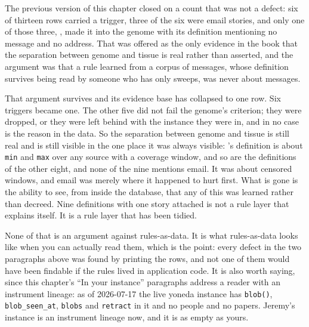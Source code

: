 The previous version of this chapter closed on a count that was not a defect: six of thirteen rows carried a trigger, three of the six were email stories, and only one of those three, , made it into the genome with its definition mentioning no message and no address. That was offered as the only evidence in the book that the separation between genome and tissue is real rather than asserted, and the argument was that a rule learned from a corpus of messages, whose definition survives being read by someone who has only sweeps, was never about messages.

That argument survives and its evidence base has collapsed to one row. Six triggers became one. The other five did not fail the genome's criterion; they were dropped, or they were left behind with the instance they were in, and in no case is the reason in the data. So the separation between genome and tissue is still real and is still visible in the one place it was always visible: 's definition is about \texttt{min} and \texttt{max} over any source with a coverage window, and so are the definitions of the other eight, and none of the nine mentions email. It was about censored windows, and email was merely where it happened to hurt first. What is gone is the ability to see, from inside the database, that any of this was learned rather than decreed. Nine definitions with one story attached is not a rule layer that explains itself. It is a rule layer that has been tidied.

None of that is an argument against rules-as-data. It is what rules-as-data looks like when you can actually read them, which is the point: every defect in the two paragraphs above was found by printing the rows, and not one of them would have been findable if the rules lived in application code. It is also worth saying, since this chapter's ``In your instance'' paragraphs address a reader with an instrument lineage: as of 2026-07-17 the live yoneda instance has \texttt{blob()}, \texttt{blob\_seen\_at}, \texttt{blobs} and \texttt{retract} in it and no people and no papers. Jeremy's instance is an instrument lineage now, and it is as empty as yours.

